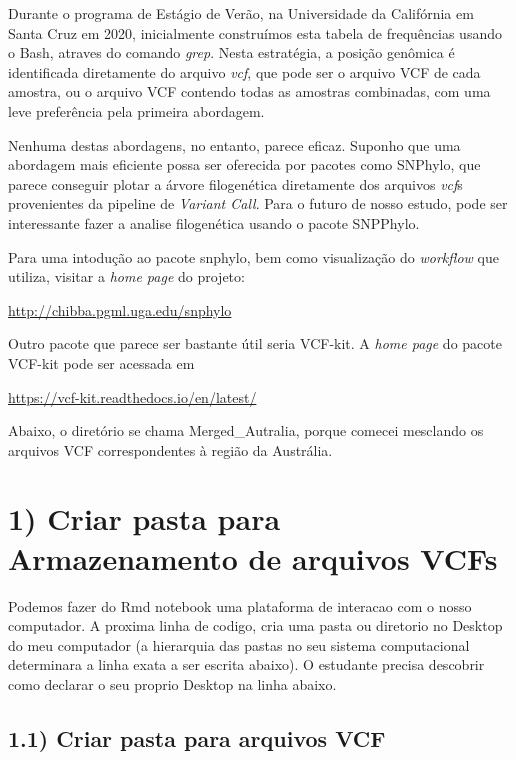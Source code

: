 \documentclass[
]{article}
\begin{document}
Durante o programa de Estágio de Verão, na Universidade da Califórnia em
Santa Cruz em 2020, inicialmente construímos esta tabela de frequências
usando o Bash, atraves do comando \emph{grep}. Nesta estratégia, a
posição genômica é identificada diretamente do arquivo \emph{vcf}, que
pode ser o arquivo VCF de cada amostra, ou o arquivo VCF contendo todas
as amostras combinadas, com uma leve preferência pela primeira
abordagem.

Nenhuma destas abordagens, no entanto, parece eficaz. Suponho que uma
abordagem mais eficiente possa ser oferecida por pacotes como SNPhylo,
que parece conseguir plotar a árvore filogenética diretamente dos
arquivos \emph{vcf}s provenientes da pipeline de \emph{Variant Call}.
Para o futuro de nosso estudo, pode ser interessante fazer a analise
filogenética usando o pacote SNPPhylo.

Para uma intodução ao pacote snphylo, bem como visualização do
\emph{workflow} que utiliza, visitar a \emph{home page} do projeto:

\url{http://chibba.pgml.uga.edu/snphylo}

Outro pacote que parece ser bastante útil seria VCF-kit. A \emph{home
page} do pacote VCF-kit pode ser acessada em

\url{https://vcf-kit.readthedocs.io/en/latest/}

Abaixo, o diretório se chama Merged\_Autralia, porque comecei mesclando
os arquivos VCF correspondentes à região da Austrália.

\hypertarget{criar-pasta-para-armazenamento-de-arquivos-vcfs}{%
\section{1) Criar pasta para Armazenamento de arquivos
VCFs}\label{criar-pasta-para-armazenamento-de-arquivos-vcfs}}

Podemos fazer do Rmd notebook uma plataforma de interacao com o nosso
computador. A proxima linha de codigo, cria uma pasta ou diretorio no
Desktop do meu computador (a hierarquia das pastas no seu sistema
computacional determinara a linha exata a ser escrita abaixo). O
estudante precisa descobrir como declarar o seu proprio Desktop na linha
abaixo.

\hypertarget{criar-pasta-para-arquivos-vcf}{%
\subsection{1.1) Criar pasta para arquivos
VCF}\label{criar-pasta-para-arquivos-vcf}}
\end{document}
